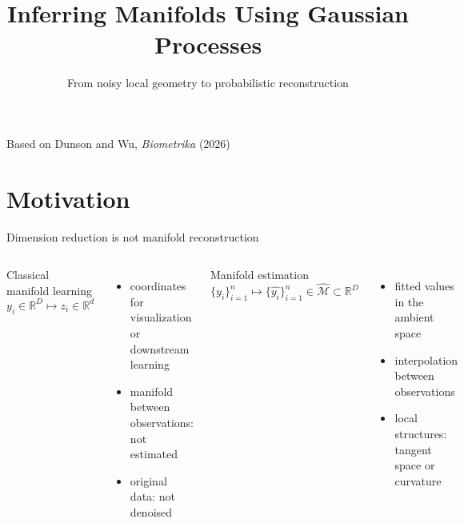 \documentclass[aspectratio=169,10pt]{beamer}
\title[Inferring manifolds with GPs]{Inferring Manifolds Using Gaussian Processes}
\subtitle{From noisy local geometry to probabilistic reconstruction}
\date{}
\newcommand{\con}[1]{\textcolor{negative}{#1}}
\newcommand{\M}{\mathcal M}
\newcommand{\R}{\mathbb R}
\begin{document}
\begin{frame}
  \titlepage
  \vspace{-0.4cm}
  \begin{center}
    \small Based on Dunson and Wu, \emph{Biometrika} (2026)
  \end{center}
\end{frame}

\section{Motivation}

\begin{frame}{Dimension reduction is not manifold reconstruction}
  \begin{columns}[T]
      \begin{block}{Classical manifold learning}
        \[
          y_i\in\R^D \longmapsto z_i\in\R^d
        \]
      \end{block}
      \begin{itemize}
        \item coordinates for visualization or downstream learning
        \item manifold between observations: \con{not estimated}
        \item original data: \con{not denoised}
      \end{itemize}
      \begin{exampleblock}{Manifold estimation}
        \[
          \{y_i\}_{i=1}^n \longmapsto \{\hat{y_i}\}_{i=1}^n\in \widehat{\M}\subset\R^D
        \]
      \end{exampleblock}
      \begin{itemize}
        \item fitted values in the ambient space
        \item interpolation between observations
        \item local structures: tangent space or curvature
      \end{itemize}
  \end{columns}
\end{frame}
\end{document}
